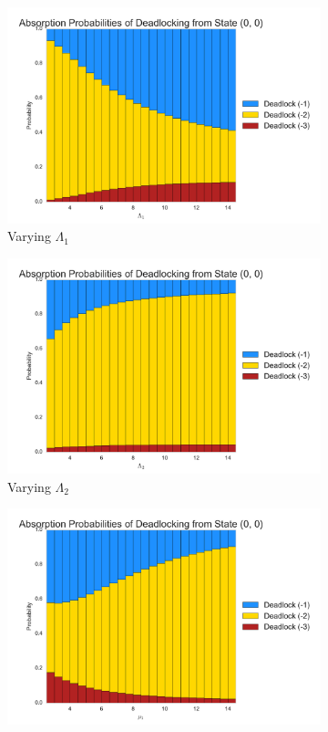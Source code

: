 \documentclass{article}
\begin{document}
\begin{figure}[!htbp]
\begin{subfigure}[b]{0.5\textwidth}
  \includegraphics[width=\textwidth]{images/absprobL1}
  \caption{Varying $\Lambda_1$}
  \label{fig:absprobL1}
\end{subfigure}
\begin{subfigure}[b]{0.5\textwidth}
  \includegraphics[width=\textwidth]{images/absprobL2}
  \caption{Varying $\Lambda_2$}
  \label{fig:absprobL2}
\end{subfigure}
\begin{subfigure}[b]{0.5\textwidth}
  \includegraphics[width=\textwidth]{images/absprobmu1}

\end{subfigure}
\end{figure}
\end{document}
